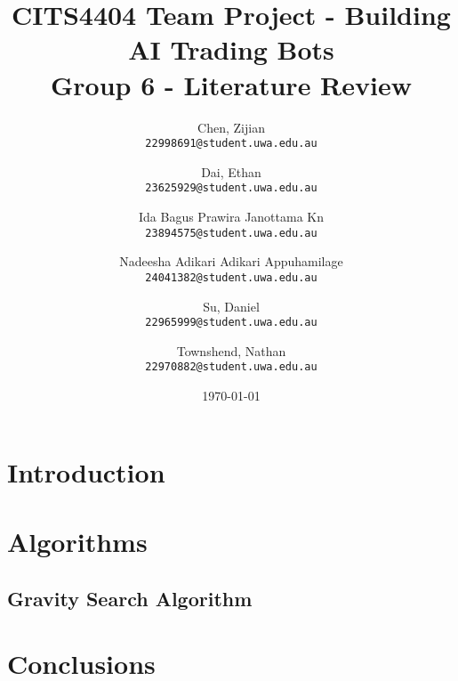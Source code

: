 \documentclass{article}
\title{
    CITS4404 Team Project - Building AI Trading Bots
    \\ \large Group 6 - Literature Review
}
\author{
    Chen, Zijian\\
    \texttt{22998691@student.uwa.edu.au}
    \and
    Dai, Ethan\\
    \texttt{23625929@student.uwa.edu.au}
    \and
    Ida Bagus Prawira Janottama Kn\\
    \texttt{23894575@student.uwa.edu.au}
    \and
    Nadeesha Adikari Adikari Appuhamilage\\
    \texttt{24041382@student.uwa.edu.au}
    \and
    Su, Daniel\\
    \texttt{22965999@student.uwa.edu.au}
    \and
    Townshend, Nathan\\
    \texttt{22970882@student.uwa.edu.au}
}
\date{\today}
\begin{document}
\clearpage

\maketitle


\newpage
\tableofcontents


\newpage
\section{Introduction}\label{sec:intro}
% 


\newpage
\section{Algorithms}\label{sec:alg}

\subsection{Gravity Search Algorithm}\label{sec:alg:gsa}



\newpage
\section{Conclusions}\label{sec:conc}
% 




\end{document}
